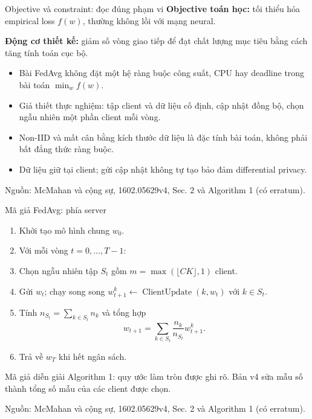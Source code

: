 \documentclass[10pt,aspectratio=43]{beamer}
\newcommand{\source}[1]{\par\vfill{\fontsize{5.8}{7}\selectfont\color{Muted}Nguồn: #1\par}}
\newcommand{\noteonly}[1]{\par{\footnotesize\color{Muted}#1\par}}
\begin{document}
\begin{frame}[t]{Objective và constraint: đọc đúng phạm vi}\relax
\small
\textbf{Objective toán học:} tối thiểu hóa empirical loss $f(w)$, thường không lồi với mạng neural.
\par\medskip
\textbf{Động cơ thiết kế:} giảm số vòng giao tiếp để đạt chất lượng mục tiêu bằng cách tăng tính toán cục bộ.
\begin{itemize}
\item Bài FedAvg không đặt một hệ ràng buộc công suất, CPU hay deadline trong bài toán $\min_w f(w)$.
\item Giả thiết thực nghiệm: tập client và dữ liệu cố định, cập nhật đồng bộ, chọn ngẫu nhiên một phần client mỗi vòng.
\item Non-IID và mất cân bằng kích thước dữ liệu là đặc tính bài toán, không phải bất đẳng thức ràng buộc.
\item Dữ liệu giữ tại client; gửi cập nhật không tự tạo bảo đảm differential privacy.
\end{itemize}
\source{McMahan và cộng sự, 1602.05629v4, Sec. 2 và Algorithm 1 (có erratum).}
\end{frame}

\begin{frame}[t]{Mã giả FedAvg: phía server}\relax
\small
\begin{enumerate}
\item Khởi tạo mô hình chung $w_0$.
\item Với mỗi vòng $t=0,\ldots,T-1$:
\item Chọn ngẫu nhiên tập $S_t$ gồm $m=\max(\lfloor CK\rfloor,1)$ client.
\item Gửi $w_t$; chạy song song $w_{t+1}^k\leftarrow\operatorname{ClientUpdate}(k,w_t)$ với $k\in S_t$.
\item Tính $n_{S_t}=\sum_{k\in S_t}n_k$ và tổng hợp
\[w_{t+1}=\sum_{k\in S_t}\frac{n_k}{n_{S_t}}w_{t+1}^k.\]
\item Trả về $w_T$ khi hết ngân sách.
\end{enumerate}
\noteonly{Mã giả diễn giải Algorithm 1: quy ước làm tròn được ghi rõ. Bản v4 sửa mẫu số thành tổng số mẫu của các client được chọn.}
\source{McMahan và cộng sự, 1602.05629v4, Sec. 2 và Algorithm 1 (có erratum).}
\end{frame}
\end{document}
